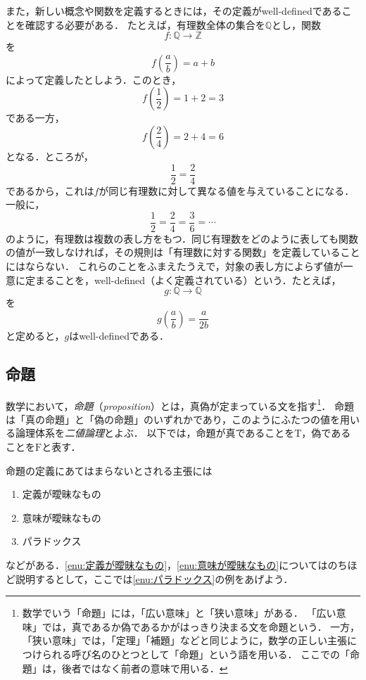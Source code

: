 また，新しい概念や関数を定義するときには，その定義がwell-definedであることを確認する必要がある．
たとえば，有理数全体の集合を$\mathbb{Q}$とし，関数
\[
  f \colon \mathbb{Q} \to \mathbb{Z}
\]
を
\[
  f\left(\frac{a}{b}\right)=a+b
\]
によって定義したとしよう．このとき，
\[
  f\left(\frac12\right)=1+2=3
\]
である一方，
\[
  f\left(\frac24\right)=2+4=6
\]
となる．ところが，
\[
  \frac12=\frac24
\]
であるから，これは$f$が同じ有理数に対して異なる値を与えていることになる．一般に，
\[
  \frac12=\frac24=\frac36=\cdots
\]
のように，有理数は複数の表し方をもつ．同じ有理数をどのように表しても関数の値が一致しなければ，その規則は「有理数に対する関数」を定義していることにはならない．
これらのことをふまえたうえで，対象の表し方によらず値が一意に定まることを，well-defined（よく定義されている）という．たとえば，
\[
g \colon \mathbb{Q} \to \mathbb{Q}
\]
を
\[
g\!\left(\frac{a}{b}\right)=\frac{a}{2b}
\]
と定めると，$g$はwell-definedである．

\subsection{命題}

数学において，\emph{命題}（\emph{proposition}）とは，真偽が定まっている文を指す\footnote{数学でいう「命題」には，「広い意味」と「狭い意味」がある．
「広い意味」では，真であるか偽であるかがはっきり決まる文を命題という．
一方，「狭い意味」では，「定理」「補題」などと同じように，数学の正しい主張につけられる呼び名のひとつとして「命題」という語を用いる．
ここでの「命題」は，後者ではなく前者の意味で用いる．}．
命題は「真の命題」と「偽の命題」のいずれかであり，このようにふたつの値を用いる論理体系を\emph{二値論理}とよぶ．
以下では，命題が真であることを$\mathrm{T}$，偽であることを$\mathrm{F}$と表す．

命題の定義にあてはまらないとされる主張には

\begin{enumerate}[(1)]
\item 定義が曖昧なもの \label{enu:定義が曖昧なもの}
\item 意味が曖昧なもの \label{enu:意味が曖昧なもの}
\item パラドックス \label{enu:パラドックス}
\end{enumerate}

などがある．\ref{enu:定義が曖昧なもの}，\ref{enu:意味が曖昧なもの}についてはのちほど説明するとして，ここでは\ref{enu:パラドックス}の例をあげよう．

